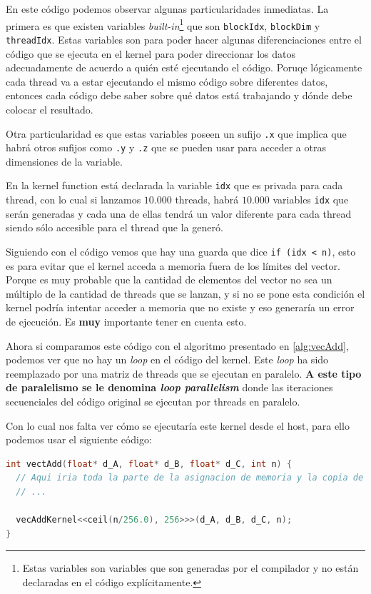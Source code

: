 En este código podemos observar algunas particularidades inmediatas. La primera es que existen variables
\textit{built-in}\footnote{Estas variables son variables que son generadas por el compilador y no están declaradas en el
código explícitamente.} que son \texttt{blockIdx}, \texttt{blockDim} y \texttt{threadIdx}. Estas variables son para
poder hacer algunas diferenciaciones entre el código que se ejecuta en el kernel para poder direccionar los datos
adecuadamente de acuerdo a quién esté ejecutando el código. Poruqe lógicamente cada thread va a estar ejecutando el
mismo código sobre diferentes datos, entonces cada código debe saber sobre qué datos está trabajando y dónde debe
colocar el resultado.

Otra particularidad es que estas variables poseen un sufijo \texttt{.x} que implica que habrá otros sufijos como
\texttt{.y} y \texttt{.z} que se pueden usar para acceder a otras dimensiones de la variable.

En la kernel function está declarada la variable \texttt{idx} que es privada para cada thread, con lo cual si lanzamos
$10.000$ threads, habrá $10.000$ variables \texttt{idx} que serán generadas y cada una de ellas tendrá un valor
diferente para cada thread siendo sólo accesible para el thread que la generó.

Siguiendo con el código vemos que hay una guarda que dice \texttt{if (idx < n)}, esto es para evitar que el kernel
acceda a memoria fuera de los límites del vector. Porque es muy probable que la cantidad de elementos del vector no
sea un múltiplo de la cantidad de threads que se lanzan, y si no se pone esta condición el kernel podría intentar
acceder a memoria que no existe y eso generaría un error de ejecución. Es \textbf{muy} importante tener en cuenta esto.

Ahora si comparamos este código con el algoritmo presentado en \ref{alg:vecAdd}, podemos ver que no hay un \textit{loop}
en el código del kernel. Este \textit{loop} ha sido reemplazado por una matriz de threads que se ejecutan en paralelo.
\textbf{A este tipo de paralelismo se le denomina \textit{loop parallelism}} donde las iteraciones secuenciales del
código original se ejecutan por threads en paralelo.

Con lo cual nos falta ver cómo se ejecutaría este kernel desde el host, para ello podemos usar el siguiente código:

\begin{lstlisting}[language=C]
int vectAdd(float* d_A, float* d_B, float* d_C, int n) {
  // Aqui iria toda la parte de la asignacion de memoria y la copia de datos
  // ...

  vecAddKernel<<ceil(n/256.0), 256>>>(d_A, d_B, d_C, n);
}
\end{lstlisting}

